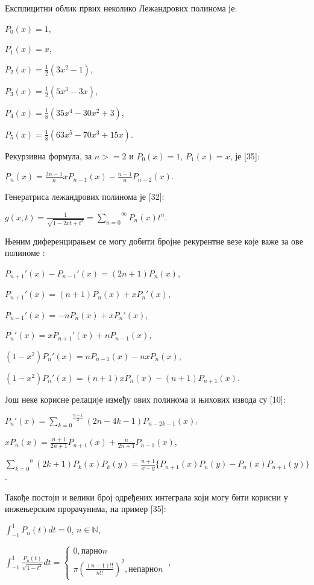 Експлицитни облик првих неколико Лежандрових полинома је:

\(P_{0}(x) = 1\),

\(P_{1}(x) = x\),

\(P_{2}(x) = \frac{1}{2}(3x^{2} - 1)\),

\(P_{3}(x) = \frac{1}{2}(5x^{3} - 3x)\),

\(P_{4}(x) = \frac{1}{8}(35x^{4} - 30x^{2} + 3)\),

\(P_{5}(x) = \frac{1}{8}(63x^{5} - 70x^{3} + 15x)\).

Рекурзивна формула, за \(n > = 2\) и \(P_{0}(x) = 1\), \(P_{1}(x) = x\),
је {[}35{]}:

\(P_{n}(x) = \frac{2n - 1}{n}xP_{n - 1}(x) - \frac{n - 1}{n}P_{n - 2}(x)\).

Генератриса лежандрових полинома је {[}32{]}:

\(g(x,t) = \frac{1}{\sqrt{1 - 2xt + t^{2}}} = \overset{\infty}{\sum_{n = 0}}P_{n}(x)t^{n}\).

Њеним диференцирањем се могу добити бројне рекурентне везе које важе за
ове полиноме :

\(P_{n + 1}'(x) - P_{n - 1}'(x) = (2n + 1)P_{n}(x)\),

\(P_{n + 1}'(x) = (n + 1)P_{n}(x) + xP_{n}'(x)\),

\(P_{n - 1}'(x) = - nP_{n}(x) + xP_{n}'(x)\),

\(P_{n}'(x) = xP_{n + 1}'(x) + nP_{n - 1}(x)\),

\((1 - x^{2})P_{n}'(x) = nP_{n - 1}(x) - nxP_{n}(x)\),

\((1 - x^{2})P_{n}'(x) = (n + 1)xP_{n}(x) - (n + 1)P_{n + 1}(x)\).

Још неке корисне релације између ових полинома и њихових извода су
{[}10{]}:

\(P_{n}'(x) = \overset{\frac{n - 1}{2}}{\sum_{k = 0}}(2n - 4k - 1)P_{n - 2k - 1}(x)\),

\(xP_{n}(x) = \frac{n + 1}{2n + 1}P_{n + 1}(x) + \frac{n}{2n + 1}P_{n - 1}(x)\),

\(\overset{n}{\sum_{k = 0}}(2k + 1)P_{k}(x)P_{k}(y) = \frac{n + 1}{x - y}\{ P_{n + 1}(x)P_{n}(y) - P_{n}(x)P_{n + 1}(y)\}\).

Такође постоји и велики број одређених интеграла који могу бити корисни
у инжењерским прорачунима, на пример {[}35{]}:

\(\int_{- 1}^{1}P_{n}(t)dt = 0\), \(n\mathbb{\in N}\),

\(\int_{- 1}^{1}\frac{P_{n}(t)}{\sqrt{1 - t^{2}}}dt = \left\{ \begin{array}{r}
0,парноn \\
\pi\left( \frac{(n - 1)!!}{n!!} \right)^{2},непарноn
\end{array} \right.\ \),

